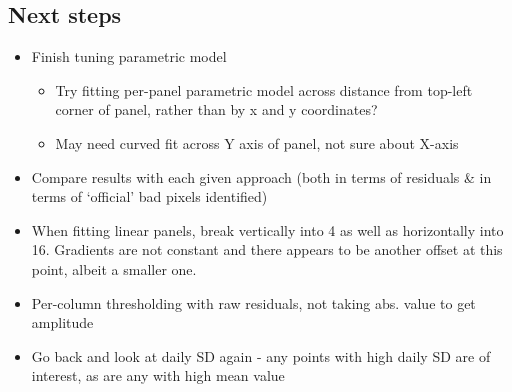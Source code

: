 \documentclass[10pt,fleqn]{article}
\begin{document}
\subsection*{Next steps}

\begin{itemize}

\item Finish tuning parametric model

\begin{itemize}
\item Try fitting per-panel parametric model across distance from top-left corner of panel, rather than by x and y coordinates?
\item May need curved fit across Y axis of panel, not sure about X-axis

\end{itemize}

\item Compare results with each given approach (both in terms of residuals \& in terms of `official' bad pixels identified)

\item When fitting linear panels, break vertically into 4 as well as horizontally into 16. Gradients are not constant and there appears to be another offset at this point, albeit a smaller one.

\item Per-column thresholding with raw residuals, not taking abs. value to get amplitude

\item Go back and look at daily SD again - any points with high daily SD are of interest, as are any with high mean value


\end{itemize}
\end{document}

